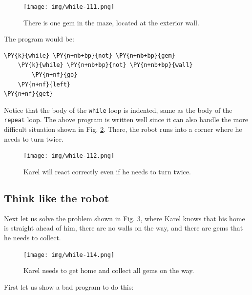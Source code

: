\begin{figure}[!ht]
\begin{center}
\texttt{[image: img/while-111.png]}
\vspace{-0mm}
\caption{There is one gem in the maze, located at the exterior wall.}
\label{fig:while-111}
\vspace{-6mm}
\end{center}
\end{figure}
\noindent
The program would be:\\

\begin{bbox}
\begin{Verbatim}[commandchars=\\\{\}]
\PY{k}{while} \PY{n+nb+bp}{not} \PY{n+nb+bp}{gem}
    \PY{k}{while} \PY{n+nb+bp}{not} \PY{n+nb+bp}{wall}
        \PY{n+nf}{go}
    \PY{n+nf}{left}
\PY{n+nf}{get}
\end{Verbatim}
\end{bbox}
\vspace{6mm}

\noindent
Notice that the body of the {\tt while} loop is indented, 
same as the body of the {\tt repeat} loop. 
The above program is written well since it can also handle the
more difficult situation shown in Fig. \ref{fig:while-112}. There, 
the robot runs into a corner where he needs to turn 
twice.

\begin{figure}[!ht]
\begin{center}
\texttt{[image: img/while-112.png]}
\vspace{-0mm}
\caption{Karel will react correctly even if he needs to turn twice.}
\label{fig:while-112}
\vspace{-6mm}
\end{center}
\end{figure}
\noindent

\subsection{Think like the robot}
Next let us solve the problem shown in Fig. \ref{fig:while-114}, where
Karel knows that his home is straight ahead of him, there are no walls on the way, 
and there are gems that he needs to collect. 
\newpage

\begin{figure}[!ht]
\begin{center}
\texttt{[image: img/while-114.png]}
\vspace{-0mm}
\caption{Karel needs to get home and collect all gems on the way.}
\label{fig:while-114}
\vspace{-6mm}
\end{center}
\end{figure}
\noindent
First let us show a bad program to do this:\\

